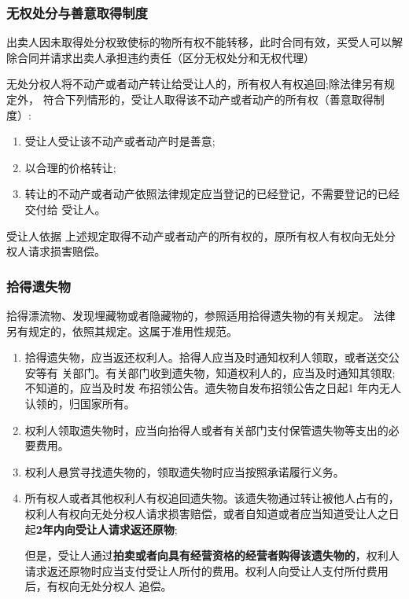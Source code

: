 \documentclass[UTF8,12pt]{ctexart}
\numberwithin{equation}{section} %
\numberwithin{figure}{section}
\numberwithin{table}{section}
\begin{document}
	\subsubsection{无权处分与善意取得制度}
	出卖人因未取得处分权致使标的物所有权不能转移，此时合同有效，买受人可以解除合同并请求出卖人承担违约责任（区分无权处分和无权代理）
	
	无处分权人将不动产或者动产转让给受让人的，所有权人有权追回;除法律另有规定外， 符合下列情形的，受让人取得该不动产或者动产的所有权（善意取得制度）:
	\begin{enumerate}
		\item 受让人受让该不动产或者动产时是善意;
		
		\item 以合理的价格转让;
	
		\item 转让的不动产或者动产依照法律规定应当登记的已经登记，不需要登记的已经交付给 受让人。
	\end{enumerate} 
	受让人依据 上述规定取得不动产或者动产的所有权的，原所有权人有权向无处分权人请求损害赔偿。
	
	\subsubsection{拾得遗失物}
	拾得漂流物、发现埋藏物或者隐藏物的，参照适用拾得遗失物的有关规定。 法律另有规定的，依照其规定。这属于准用性规范。
	\begin{enumerate}
		\item 拾得遗失物，应当返还权利人。拾得人应当及时通知权利人领取，或者送交公安等有 关部门。有关部门收到遗失物，知道权利人的，应当及时通知其领取;不知道的，应当及时发 布招领公告。遗失物自发布招领公告之日起1 年内无人认领的，归国家所有。
		
		\item 权利人领取遗失物时，应当向抬得人或者有关部门支付保管遗失物等支出的必要费用。
		
		\item 权利人悬赏寻找遗失物的，领取遗失物时应当按照承诺履行义务。
		
		\item 所有权人或者其他权利人有权追回遗失物。该遗失物通过转让被他人占有的，权利人有权向无处分权人请求损害赔偿，或者自知道或者应当知道受让人之日起\textbf{2年内向受让人请求返还原物};
		
		但是，受让人通过\textbf{拍卖或者向具有经营资格的经营者购得该遗失物的}，权利人请求返还原物时应当支付受让人所付的费用。权利人向受让人支付所付费用后，有权向无处分权人 追偿。
		
	\end{enumerate}
	
\end{document}
